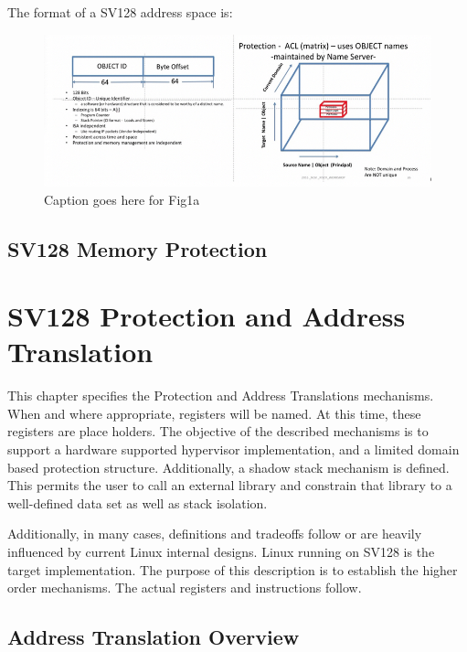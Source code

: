 \documentclass{article}
\begin{document}
The format of a SV128 address space is:

\begin{figure}[h]
\includegraphics[scale = .4] 
{figures/figure1a.jpg}
\caption{Caption goes here for Fig1a}
\end{figure}

\subsection{SV128 Memory Protection}
\label{sec:SV128MemoryProtection}

\section{SV128 Protection and Address Translation} 

This chapter specifies  the Protection and Address Translations mechanisms. When and where appropriate,  registers will be named.  At this time,  these registers are place holders. The objective of the described mechanisms is to support a hardware supported hypervisor implementation, and a limited domain based protection structure.  Additionally, a shadow stack mechanism is defined.  This permits the user to call an external library and constrain that library to  a well-defined data set as well as stack isolation.  

Additionally, in many cases,  definitions and tradeoffs follow or are heavily influenced by current Linux internal designs.   Linux running on SV128 is the target implementation. The purpose of this description is to establish the higher order mechanisms.  The actual registers and instructions follow. 

\subsection {Address Translation Overview}
\end{document}
